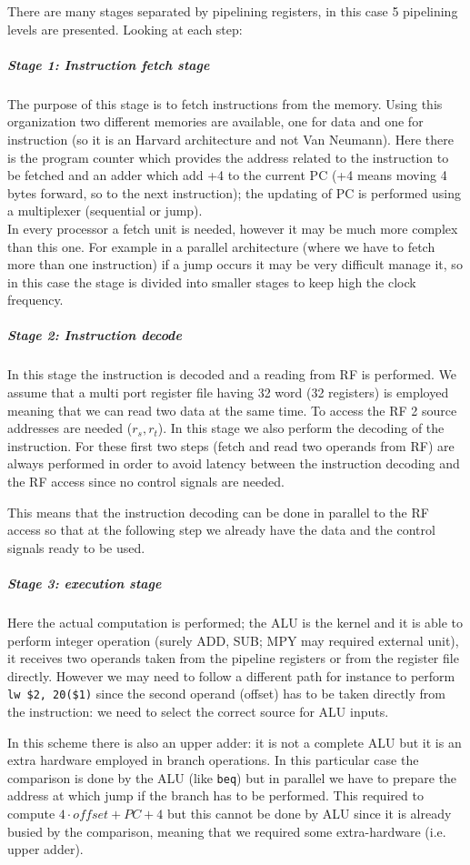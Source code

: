 There are many stages separated by pipelining registers, in this case 5
pipelining levels are presented. Looking at each step:

\subparagraph{Stage 1: Instruction fetch stage}
The purpose of this stage is to fetch instructions from the memory. Using this
organization two different memories are available, one for data and one for
instruction (so it is an Harvard architecture and not Van Neumann). Here there
is the program counter which provides the address related to the instruction to
be fetched and an adder which add +4 to the current PC (+4 means moving 4 bytes
forward, so to the next instruction); the updating of PC is performed using a
multiplexer (sequential or jump).\\
In every processor a fetch unit is needed, however it may be much more complex
than this one. For example in a parallel architecture (where we have to fetch
more than one instruction) if a jump occurs it may be very difficult manage it,
so in this case the stage is divided into smaller stages to keep high the clock
frequency.

\subparagraph{Stage 2: Instruction decode}
In this stage the instruction is decoded and a reading from RF is performed.
We assume that a multi port register file having 32 word (32 registers) is
employed meaning that we can read two data at the same time. To access the RF
2 source addresses are needed ($r_s, r_t$). In this stage we also perform the
decoding of the instruction. For these first two steps (fetch and read two
operands from RF) are always performed in order to avoid latency between the
instruction decoding and the RF access since no control signals are needed.

This means that the instruction decoding can be done in parallel to the RF
access so that at the following step we already have the data and the control
signals ready to be used.

\subparagraph{Stage 3: execution stage}
Here the actual computation is performed; the ALU is the kernel and it is able
to perform integer operation (surely ADD, SUB; MPY may required external unit),
it receives two operands taken from the pipeline registers or from the register
file directly. However we may need to follow a different path for instance to
perform \verb|lw $2, 20($1)| since the second operand (offset) has to be taken
directly from the instruction: we need to select the correct source for ALU
inputs.

In this scheme there is also an upper adder: it is not a complete ALU but it is
an extra hardware employed in branch operations. In this particular case the
comparison is done by the ALU (like \verb|beq|) but in parallel we have to
prepare the address at which jump if the branch has to be performed. This
required to compute $4 \cdot offset + PC+4$ but this cannot be done by ALU
since it is already busied by the comparison, meaning that we required some
extra-hardware (i.e. upper adder).


